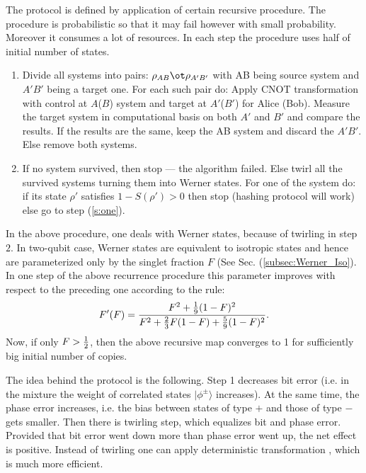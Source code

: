 \documentclass[rmp,12pt,preprint]{revtex4-2}
\begin{document}
The protocol is defined by application of certain recursive
procedure. The procedure is probabilistic so that it may fail however
with small probability. Moreover it consumes a lot of resources. In
each step the procedure uses half of initial number of states.
\begin{enumerate}
\item
\label{s:one} Divide all systems into pairs:
$\rho_{AB}\ot\rho_{A'B'}$ with AB being source system and $A'B'$ being
a target one. For each such pair do:  Apply CNOT
transformation with control at $A$($B$) system and target at
$A'$($B'$) for Alice (Bob).  Measure the target system
in computational basis on both $A'$ and $B'$ and compare the
results.  If the results are the same, keep the AB
system and discard the $A'B'$. Else remove both systems.

\item If no system survived, then stop --- the algorithm failed. Else
  twirl all the survived systems turning them into Werner states.
 For one of the system do: if its state $\rho'$ satisfies
$1-S(\rho')>0$ then stop (hashing protocol will work) else go to
step (\ref{s:one}).
\end{enumerate}

In the above procedure, one deals with Werner states, because of
twirling in step $2$. In two-qubit case, Werner states are equivalent
to isotropic states and hence are parameterized only by the singlet
fraction $F$ (See Sec. (\ref{subsec:Werner_Iso}).  In one step of the
above recurrence procedure this parameter improves with respect to the
preceding one according to the rule:
\begin{equation}
F'(F) = {{F^2+{1\over 9}(1-F)^2}\over {F^2+{2\over
3}F(1-F)+{5\over 9}(1-F)^2}}.
\end{equation}
Now, if only $F>{1\over 2}$, then the above recursive map converges to
1 for sufficiently big initial number of copies.

The idea behind the protocol is the following. Step 1 decreases bit
error (i.e. in the mixture the weight of correlated states
$|\phi^\pm\rangle$ increases). At the same time, the phase error
increases, i.e. the bias between states of type $+$ and those of type
$-$ gets smaller. Then there is twirling step, which equalizes bit and
phase error. Provided that bit error went down more than phase error went
up, the net effect is positive. Instead of twirling one can apply
deterministic transformation \cite{QPA}, which is much more efficient.
\end{document}
